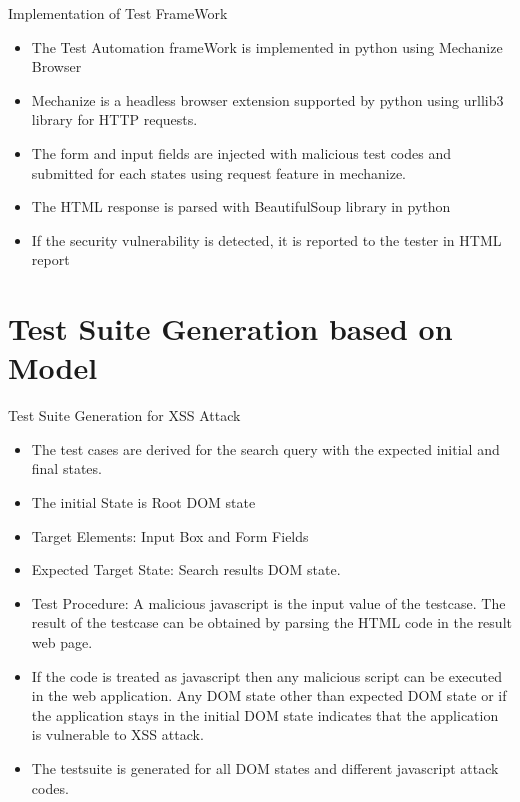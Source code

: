 \documentclass{beamer}
\begin{document}
\begin{frame}{Implementation of Test FrameWork}
\begin{itemize}
    \item The Test Automation frameWork is implemented in python using Mechanize Browser
    \item Mechanize is a headless browser extension supported by python using urllib3 library for HTTP requests.
    \item The form and input fields are injected with malicious test codes and submitted for each states using request feature in mechanize.
    \item The HTML response is parsed with BeautifulSoup library in python
    \item If the security vulnerability is detected, it is reported to the tester in HTML report
    
\end{itemize}

\end{frame}



\section{Test Suite Generation based on Model}
\begin{frame}{Test Suite Generation for XSS Attack}
\begin{itemize}
    \item The test cases are derived for the search query with the expected initial and final states.
    \item The initial State is Root DOM state 
    \item Target Elements: Input Box and Form Fields
    \item Expected Target State: Search results DOM state. 
    \item Test Procedure: A malicious javascript is the input value of the testcase. The result of the testcase can be obtained by parsing the HTML code in the result web page. 
    \item If the code is treated as javascript then any malicious script can be executed in the web application. Any DOM state other than expected DOM state or if the application stays in the initial DOM state indicates that the application is vulnerable to XSS attack. 
    \item The testsuite is generated for all DOM states and different javascript attack codes.

\end{itemize}
\end{frame}
\end{document}
